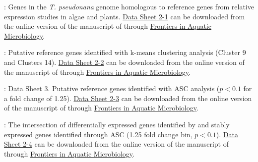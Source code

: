     \begin{DS2}
    
    \item \label{DS21}: Genes in the \textit{T. pseudonana} genome homologous to reference genes from relative expression studies in algae and plants. \href{http://journal.frontiersin.org/file/downloadfile/16019/octet-stream/Data\%20Sheet\%201.XLS/313/2/31186}{Data Sheet 2-1} can be downloaded from the online version of the manuscript of \citet{Alexander2012} through \href{http://dx.doi.org/10.3389/fmicb.2012.00385}{Frontiers in Aquatic Microbiology}. 
    \item \label{DS22}: Putative reference genes identified with k-means clustering analysis (Cluster 9 and Clusters 14). \href{http://journal.frontiersin.org/file/downloadfile/16022/octet-stream/Data\%20Sheet\%202.XLS/313/1/31186}{Data Sheet 2-2} can be downloaded from the online version of the manuscript of \citet{Alexander2012} through \href{http://dx.doi.org/10.3389/fmicb.2012.00385}{Frontiers in Aquatic Microbiology}. 
        \item \label{DS23}: Data Sheet 3. Putative reference genes identified with ASC analysis ($p < 0.1$ for a fold change of 1.25). \href{http://journal.frontiersin.org/file/downloadfile/16025/octet-stream/Data\%20Sheet\%203.XLS/313/1/31186}{Data Sheet 2-3} can be downloaded from the online version of the manuscript of \citet{Alexander2012} through \href{http://dx.doi.org/10.3389/fmicb.2012.00385}{Frontiers in Aquatic Microbiology}. 

            \item \label{DS24}: The intersection of differentially expressed genes identified by \citet{Mock2008} and stably expressed genes identified through ASC (1.25 fold change bin, $p < 0.1$). \href{http://journal.frontiersin.org/file/downloadfile/16028/octet-stream/Data\%20Sheet\%204.XLS/313/1/31186}{Data Sheet 2-4} can be downloaded from the online version of the manuscript of \citet{Alexander2012} through \href{http://dx.doi.org/10.3389/fmicb.2012.00385}{Frontiers in Aquatic Microbiology}. 

    \end{DS2}




